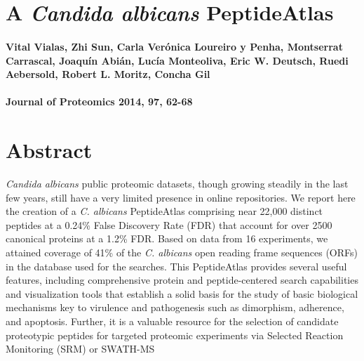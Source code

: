 %
%


\chapter*{A \textit{\textit{Candida albicans}} PeptideAtlas}

\renewcommand{\headrulewidth}{0pt}

\subsubsection*{Vital Vialas, Zhi Sun, Carla Ver\'onica Loureiro y Penha, Montserrat Carrascal, Joaqu\'in Abi\'an, Luc\'ia Monteoliva, Eric W. Deutsch, Ruedi Aebersold, Robert L. Moritz, Concha Gil}
\subsubsection*{Journal of Proteomics 2014, 97, 62-68}

\newpage


%
%



\chapter*{Abstract}
\textit{Candida albicans} public proteomic datasets, though growing
 steadily in the last few years, still have a very limited presence in
 online repositories. We report here the creation of a \textit{C. albicans} PeptideAtlas
 comprising near 22,000 distinct peptides at a 0.24\% False Discovery
 Rate (FDR) that account for over 2500 canonical proteins at a 1.2\% FDR.
 Based on data from 16 experiments, we attained coverage of 41\% of the 
 \textit{C. albicans} open reading frame sequences (ORFs) in the database used 
 for the searches. This PeptideAtlas provides several useful features, 
 including comprehensive protein and peptide-centered search 
 capabilities and visualization tools that establish a solid basis for 
 the study of basic biological mechanisms key to virulence and 
 pathogenesis such as dimorphism, adherence, and apoptosis. 
 Further, it is a valuable resource for the selection of candidate 
 proteotypic peptides for targeted proteomic experiments via Selected
 Reaction Monitoring (SRM) or SWATH-MS

